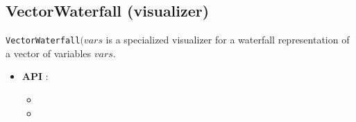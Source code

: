\subsection{VectorWaterfall (visualizer)}\label{vectorwaterfall:visu}\hypertarget{vectorwaterfall:visu}{}
\begin{notedef}
  \texttt{VectorWaterfall}$(vars$ is a specialized visualizer for a waterfall representation of a vector of variables $vars$.
\end{notedef}

\begin{itemize}
	\item \textbf{API} : 
	\begin{itemize}
	\item {}
	\item {}
	\end{itemize}
\end{itemize}

%

